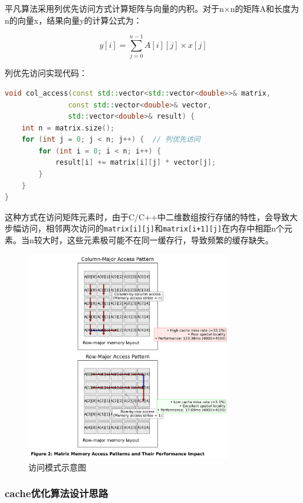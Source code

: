 \documentclass[a4paper,colorlinks=true,linkcolor=blue,urlcolor=blue,citecolor=green,bookmarks=true]{article}
\begin{document}
平凡算法采用列优先访问方式计算矩阵与向量的内积。对于n×n的矩阵A和长度为n的向量x，结果向量y的计算公式为：

\begin{equation}
  y[i] = \sum_{j=0}^{n-1} A[i][j] \times x[j]
\end{equation}

列优先访问实现代码：

\begin{lstlisting}[language=C++]
void col_access(const std::vector<std::vector<double>>& matrix, 
               const std::vector<double>& vector,
               std::vector<double>& result) {
    int n = matrix.size();
    for (int j = 0; j < n; j++) {  // 列优先访问
        for (int i = 0; i < n; i++) {
            result[i] += matrix[i][j] * vector[j];
        }
    }
}
\end{lstlisting}

这种方式在访问矩阵元素时，由于C/C++中二维数组按行存储的特性，会导致大步幅访问，相邻两次访问的\verb|matrix[i][j]|和\verb|matrix[i+1][j]|在内存中相距n个元素。当n较大时，这些元素极可能不在同一缓存行，导致频繁的缓存缺失。

\begin{figure}[htbp]
  \centering
  \includegraphics[width=0.8\textwidth]{access_patterns_diagram.png}
  \caption{访问模式示意图}
  \label{fig:access_patterns}
\end{figure}

\subsubsection{cache优化算法设计思路}
\end{document}
